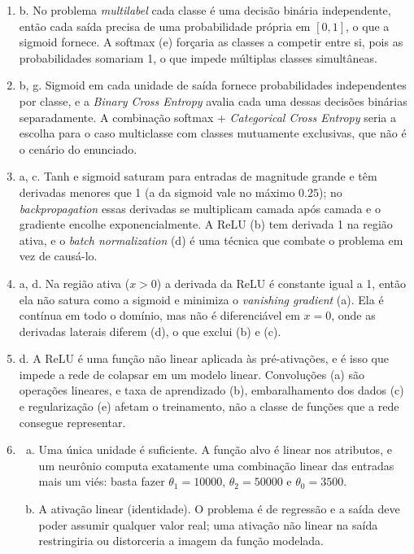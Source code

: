\documentclass{dlproblemset}
\begin{document}
\begin{enumerate}[1)]
    \item b. No problema \textit{multilabel} cada classe é uma decisão binária independente, então cada saída precisa de uma probabilidade própria em $[0,1]$, o que a sigmoid fornece. A softmax (e) forçaria as classes a competir entre si, pois as probabilidades somariam 1, o que impede múltiplas classes simultâneas.

    \item b, g. Sigmoid em cada unidade de saída fornece probabilidades independentes por classe, e a \textit{Binary Cross Entropy} avalia cada uma dessas decisões binárias separadamente. A combinação softmax + \textit{Categorical Cross Entropy} seria a escolha para o caso multiclasse com classes mutuamente exclusivas, que não é o cenário do enunciado.

    \item a, c. Tanh e sigmoid saturam para entradas de magnitude grande e têm derivadas menores que 1 (a da sigmoid vale no máximo $0.25$); no \textit{backpropagation} essas derivadas se multiplicam camada após camada e o gradiente encolhe exponencialmente. A ReLU (b) tem derivada 1 na região ativa, e o \textit{batch normalization} (d) é uma técnica que combate o problema em vez de causá-lo.

    \item a, d. Na região ativa ($x>0$) a derivada da ReLU é constante igual a 1, então ela não satura como a sigmoid e minimiza o \textit{vanishing gradient} (a). Ela é contínua em todo o domínio, mas não é diferenciável em $x=0$, onde as derivadas laterais diferem (d), o que exclui (b) e (c).

    \item d. A ReLU é uma função não linear aplicada às pré-ativações, e é isso que impede a rede de colapsar em um modelo linear. Convoluções (a) são operações lineares, e taxa de aprendizado (b), embaralhamento dos dados (c) e regularização (e) afetam o treinamento, não a classe de funções que a rede consegue representar.

    \item
    \begin{enumerate}[(a)]
        \item Uma única unidade é suficiente. A função alvo é linear nos atributos, e um neurônio computa exatamente uma combinação linear das entradas mais um viés: basta fazer $\theta_1 = 10000$, $\theta_2 = 50000$ e $\theta_0 = 3500$.
        \item A ativação linear (identidade). O problema é de regressão e a saída deve poder assumir qualquer valor real; uma ativação não linear na saída restringiria ou distorceria a imagem da função modelada.
    \end{enumerate}


\end{enumerate}
\end{document}
